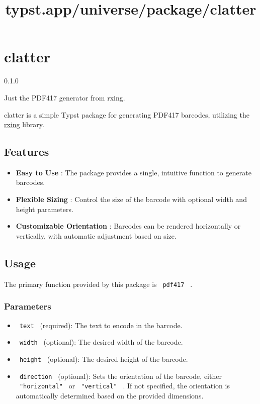 \title{typst.app/universe/package/clatter}

\label{banner}
\section{clatter}\label{clatter}

{ 0.1.0 }

Just the PDF417 generator from rxing.

\label{readme}
clatter is a simple Typst package for generating PDF417 barcodes,
utilizing the \href{https://github.com/rxing-core/rxing}{rxing} library.

\subsection{Features}\label{features}

\begin{itemize}
\tightlist
\item
  \textbf{Easy to Use} : The package provides a single, intuitive
  function to generate barcodes.
\item
  \textbf{Flexible Sizing} : Control the size of the barcode with
  optional width and height parameters.
\item
  \textbf{Customizable Orientation} : Barcodes can be rendered
  horizontally or vertically, with automatic adjustment based on size.
\end{itemize}

\subsection{Usage}\label{usage}

The primary function provided by this package is \texttt{\ pdf417\ } .

\subsubsection{Parameters}\label{parameters}

\begin{itemize}
\tightlist
\item
  \texttt{\ text\ } (required): The text to encode in the barcode.
\item
  \texttt{\ width\ } (optional): The desired width of the barcode.
\item
  \texttt{\ height\ } (optional): The desired height of the barcode.
\item
  \texttt{\ direction\ } (optional): Sets the orientation of the
  barcode, either \texttt{\ "horizontal"\ } or \texttt{\ "vertical"\ } .
  If not specified, the orientation is automatically determined based on
  the provided dimensions.
\end{itemize}

